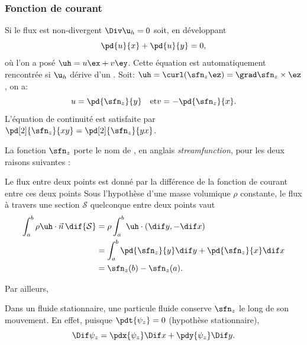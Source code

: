 \subsubsection{Fonction de courant \label{sect:courant}}
Si le flux est non-divergent $\Div\u_h = 0$ soit, en développant
\begin{displaymath}
  \pd{u}{x} + \pd{u}{y} = 0,
\end{displaymath}
où l'on a posé $\uh=u\ex + v\ey$. Cette équation est automatiquement rencontrée si $\u_h$ dérive d'un . Soit: $\uh = \curl (\sfn_z \ez) = \grad \sfn_z \times \ez$, on a:
\begin{displaymath}
  u = \pd{\sfn_z}{y}\quad \text{et} v = -\pd{\sfn_z}{x}.
\end{displaymath}
L'équation de continuité est satisfaite par $\pd[2]{\sfn_z}{xy} = \pd[2]{\sfn_z}{yx}$.

La fonction $\sfn_z$ porte le nom de , en anglais \emph{streamfunction}, pour les deux raisons suivantes :

\begin{key}{Le flux entre deux points est donné par la différence de la fonction de courant entre ces deux points}
  Sous l'hypothèse d'une masse volumique $\rho$ constante, le flux à travers une section $\mathcal{S}$ quelconque entre deux points vaut
  \begin{displaymath}
    \begin{split}
      \int_a^b \rho \uh\cdot \vec{n}\, \dif {\mathcal S} &= \rho \int_a^b \uh\cdot(\dif y, -\dif x) \\
                                                         &= \int_a^b \pd{\sfn_z}{y}\dif y + \pd{\sfn_z}{x}\dif x  \\
                                                         &= \sfn_{z}(b) - \sfn_{z}(a).
    \end{split}
  \end{displaymath}
\end{key}

Par ailleurs,
\begin{key}{Dans un fluide stationnaire, une particule fluide conserve $\sfn_z$ le long de son mouvement.}
En effet, puisque $\pdt{\psi_z}=0$ (hypothèse stationnaire),
\begin{displaymath}
  \Dif \psi_z = \pdx {\psi_z} \Dif x + \pdy {\psi_z} \Dif y.
\end{displaymath}
\end{key}

